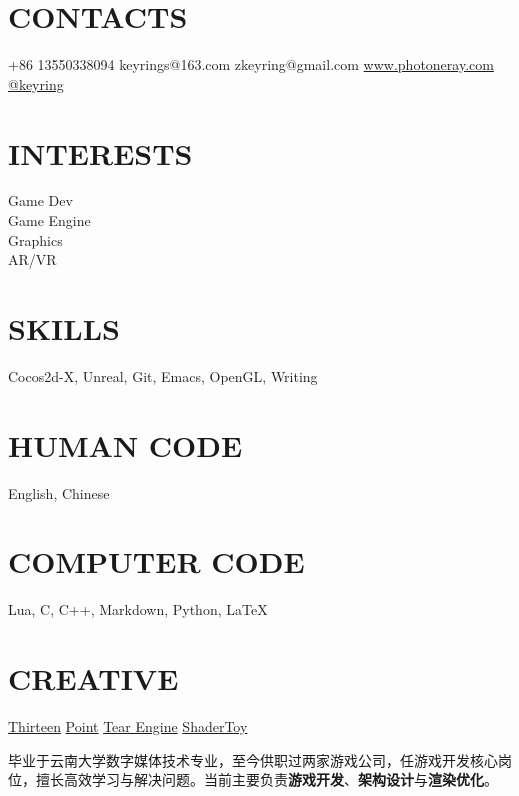\documentclass[full]{rvca}
\begin{document}


\begin{aside} %
\section{\uppercase{contacts}}
+86 13550338094 {\faMobile}
keyrings@163.com {\scriptsize\faLink}
zkeyring@gmail.com {\scriptsize\faLink}
\href{http://www.photoneray.com}{\color{sidebandtextcolor}www.photoneray.com \faGlobe} 
\href{https://github.com/keyring}{\color{sidebandtextcolor}@keyring \faGithub}
\ghost
\section{\uppercase{interests}}
Game Dev\\Game Engine\\Graphics\\AR/VR
\ghost
\section{\uppercase{skills}}
{\scriptsize\faHeart}Cocos2d-X, Unreal, Git, Emacs, OpenGL, Writing
\ghost 
\section{\uppercase{human code}}
English, Chinese
\ghost
\section{\uppercase{computer code}}
{\scriptsize\faHeart}Lua, {\scriptsize\faHeart}C, C++, {\scriptsize\faHeart}Markdown, Python, \LaTeX
\ghost
\section{\uppercase{creative}}
\href{http://a.app.qq.com/o/simple.jsp?pkgname=com.kode.Thirteen}{\color{sidebandtextcolor}Thirteen}
\href{https://github.com/keyring/point}{\color{sidebandtextcolor}Point}
\href{http://www.photoneray.com/Tear}{\color{sidebandtextcolor}Tear Engine}
\href{https://github.com/keyring/ShaderToy}{\color{sidebandtextcolor}ShaderToy}
\ghost
\end{aside}



\begin{statement}
毕业于云南大学数字媒体技术专业，至今供职过两家游戏公司，任游戏开发核心岗位，擅长高效学习与解决问题。当前主要负责\textbf{游戏开发}、\textbf{架构设计}与\textbf{渲染优化}。
\end{statement}
\end{document}
